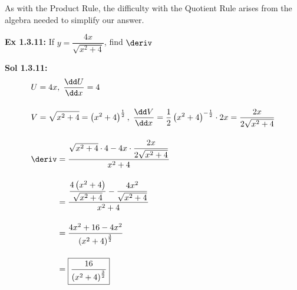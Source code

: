 As with the Product Rule, the difficulty with the Quotient Rule arises from the algebra needed to simplify our answer. \par

\begin{tcolorbox}[example]
    \textbf{Ex 1.3.11: } If $y = \dfrac{4x}{\sqrt{x^2 + 4}}$, find $\deriv$ 
\end{tcolorbox}
\begin{tcolorbox}[solution]
    \textbf{Sol 1.3.11: } \begin{align*}
        & U = 4x, \; \dfrac{\dd U}{\dd x} = 4 \\[11pt]
        & V = \sqrt{x^2 + 4} = \left(x^2 + 4\right)^\frac{1}{2}, \; \dfrac{\dd V}{\dd x} = \dfrac{1}{2}\left(x^2 + 4\right)^{-\frac{1}{2}} \cdot 2x = \dfrac{2x}{2\sqrt{x^2 + 4}} \\[11pt]
        & \deriv \begin{aligned}[t]
            & = \dfrac{\sqrt{x^2 + 4} \cdot 4 - 4x \cdot \dfrac{2x}{2\sqrt{x^2 + 4}}}{x^2 + 4} \\[11pt]
            & = \dfrac{\dfrac{4\left(x^2 + 4\right)}{\sqrt{x^2 + 4}} - \dfrac{4x^2}{\sqrt{x^2 + 4}}}{x^2 + 4} \\[11pt]
            & = \dfrac{4x^2 + 16 - 4x^2}{\left(x^2 + 4\right)^\frac{3}{2}} \\[11pt]
            & = \boxed{\dfrac{16}{\left(x^2 + 4\right)^\frac{3}{2}}}
        \end{aligned}
    \end{align*}
\end{tcolorbox} \vspace{11pt}

